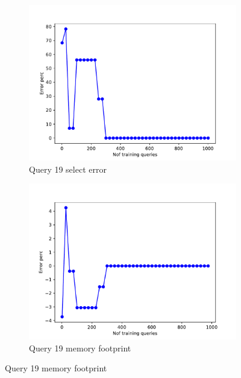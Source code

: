 \begin{figure}[t!]
  \begin{subfigure}[t]{0.5\textwidth}
    \includegraphics[scale=0.4]{figs/airtraffic/airtraffic_sel19_1_error.pdf}
    \caption{Query 19 select error}
    \label{fig:sel19}
  \end{subfigure}
  \begin{subfigure}[t]{0.5\textwidth}
    \includegraphics[scale=0.4]{figs/airtraffic/airtraffic_q19_1_memerror.pdf}
    \caption{Query 19 memory footprint}
    \label{fig:mem19}
   \end{subfigure}

\end{figure}







